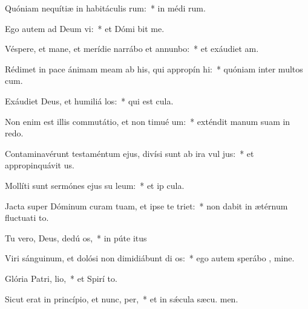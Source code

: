 \item Quóniam nequítiæ in habitáculis rum:~* in médi rum.
\item Ego autem ad Deum vi:~* et Dómi bit me.
\item Véspere, et mane, et merídie narrábo et annunbo:~* et exáudiet  am.
\item Rédimet in pace ánimam meam ab his, qui appropín hi:~* quóniam inter multos  cum.
\item Exáudiet Deus, et humiliá los:~* qui est  cula.
\item Non enim est illis commutátio, et non timué um:~* exténdit manum suam in redo.
\item Contaminavérunt testaméntum ejus, divísi sunt ab ira vul jus:~* et appropinquávit  us.
\item Mollíti sunt sermónes ejus su leum:~* et ip  cula.
\item Jacta super Dóminum curam tuam, et ipse te triet:~* non dabit in ætérnum fluctuati to.
\item Tu vero, Deus, dedú os,~* in púte itus
\item Viri sánguinum, et dolósi non dimidiábunt di os:~* ego autem sperábo  , mine.
\item Glória Patri,  lio,~* et Spirí to.
\item Sicut erat in princípio, et nunc,  per,~* et in sǽcula sæcu. men.
